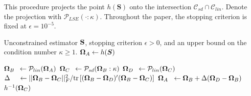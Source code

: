 \documentclass[11pt]{article}
\newcommand{\bLambda}{\boldsymbol{\lambda}}
\theoremstyle{definition}
\theoremstyle{definition}
\def\bLambda{{\bf \Lambda}}
\def\bOmega{{\bf \Omega}}
\def\SS{{\bf S}}
\def\Tr{\text{tr}}
\begin{document}
\begin{algorithm}[t]
\caption{This procedure projects the point $h(\boldsymbol{S})$ onto the intersection $\mathcal{C}_{sd} \cap \mathcal{C}_{lin}$. Denote the projection with $\mathcal{P}_{LSE}(\cdot : \kappa)$. Throughout the paper, the stopping criterion is fixed at $\epsilon = 10^{-5}$.}
\label{proj_algo}
\begin{algorithmic}[1]
\Require Unconstrained estimator $\SS$, stopping criterion $\epsilon > 0$, and an upper bound on the condition number $\kappa \geq 1$. 
\State $\bOmega_{A} \leftarrow  h(\boldsymbol{S})$
\Repeat

\State $\bOmega_{B} \hspace{0.5em} \leftarrow \mathcal{P}_{lin}(\bOmega_{A})$
\State $\bOmega_{C} \hspace{0.5em} \leftarrow \mathcal{P}_{sd}(\bOmega_{B}: \kappa)$
\State $\bOmega_{D} \hspace{0.5em} \leftarrow \mathcal{P}_{lin}(\bOmega_{C})$
\State $\Delta \hspace{1.2em}\leftarrow ||\bOmega_{B} - \bOmega_{C}||_F^2 / \Tr\left[(\bOmega_{B}-\bOmega_{D})' (\bOmega_{B}-\bOmega_{C} )\right]$
\State $\bOmega_{A} \hspace{0.6em} \leftarrow \bOmega_{B} + \Delta(\bOmega_{D}-\bOmega_{B})$
\Until{$\max \left\{\left(\bOmega_{D}-\bOmega_{C}\right)_{ij}^2\right\} < \epsilon$}
\State
\Return $h^{-1}(\bOmega_{C})$
\EndProcedure
\end{algorithmic}
\label{algo}
\end{algorithm}
\end{document}
